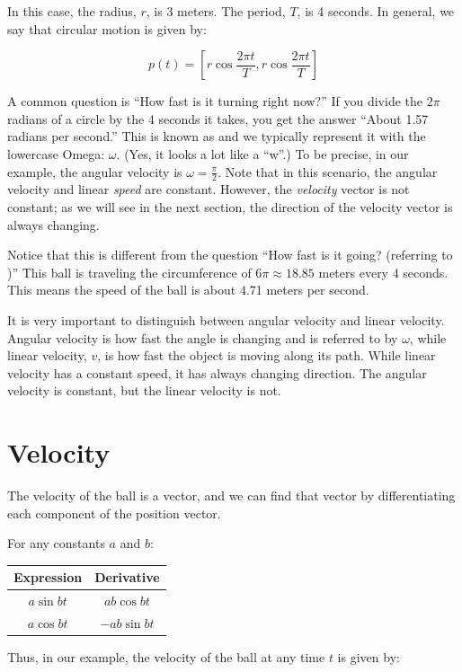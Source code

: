 In this case, the radius, $r$, is 3 meters.  The period, $T$, is 4
seconds.  In general, we say that circular motion is given by:

$$p(t) = \left[ r \cos{\frac{2 \pi t}{T}}, r \cos{\frac{2 \pi t}{T}}\right]$$

A common question is ``How fast is it turning right now?''  If you
divide the $2\pi$ radians of a circle by the 4 seconds it takes, you
get the answer ``About 1.57 radians per second.''  This is known as
 and we typically represent it with the
lowercase Omega: $\omega$. (Yes, it looks a lot like a ``w''.)  To be
precise, in our example, the angular velocity is $\omega = \frac{\pi}{2}$. Note that in this scenario, the angular velocity and linear \emph{speed} are constant. However, the \emph{velocity} vector is not constant; as we will see in the next section, the direction of the velocity vector is always changing.

Notice that this is different from the question ``How fast is it
going? (referring to )''  This ball is traveling the circumference of $6\pi \approx
18.85$ meters every 4 seconds.  This means the speed of the ball is about
4.71 meters per second.

It is very important to distinguish between angular velocity and linear velocity. Angular velocity is how fast the angle is changing and is referred to by $\omega$, while linear velocity, $v$, is how fast the object is moving along its path. While linear velocity has a constant speed, it has always changing direction. The angular velocity is constant, but the linear velocity is not.

\section{Velocity}
The velocity of the ball is a vector, and we can find that vector by
differentiating each component of the position vector.

For any constants $a$ and $b$:

\begin{tabular}{c | c }
  Expression & Derivative \\
  \hline
  $a \sin{b t}$ & $ab \cos{b t}$ \\
  $a \cos{b t}$ & $-ab \sin{b t}$  \\
\end{tabular}

Thus, in our example, the velocity of the ball at any time $t$ is given by:

